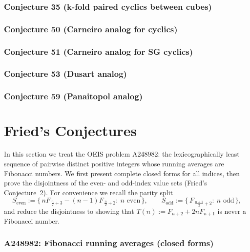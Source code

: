 \documentclass[12pt]{article}
\providecommand{\seqnum}[1]{#1}
\theoremstyle{remark}
\begin{document}
\subsubsection{Conjecture 35 (k-fold paired cyclics between cubes)}




\subsubsection{Conjecture 50 (Carneiro analog for cyclics)}


\subsubsection{Conjecture 51 (Carneiro analog for SG cyclics)}


\subsubsection{Conjecture 53 (Dusart analog)}


\subsubsection{Conjecture 59 (Panaitopol analog)}



\section{Fried's Conjectures}

In this section we treat the OEIS problem \seqnum{A248982}: the lexicographically least sequence of pairwise distinct positive integers whose running averages are Fibonacci numbers. We first present complete closed forms for all indices, then prove the disjointness of the even- and odd-index value sets (Fried's Conjecture~2). For convenience we recall the parity split
\[
 S_{\mathrm{even}}:=\bigl\{\,nF_{\,\frac{n}{2}+3}-(n-1)F_{\,\frac{n}{2}+2}:\ n\text{ even}\,\bigr\},\qquad
 S_{\mathrm{odd}}:=\bigl\{\,F_{\,\frac{n+1}{2}+2}:\ n\text{ odd}\,\bigr\},
\]
and reduce the disjointness to showing that $T(n):=F_{n+2}+2nF_{n+1}$ is never a Fibonacci number.

\subsubsection{A248982: Fibonacci running averages (closed forms)}

\end{document}

